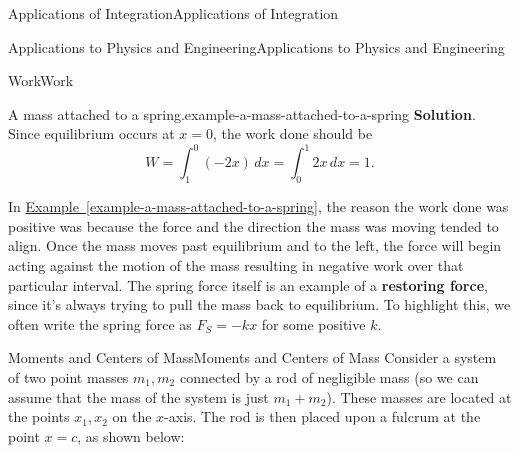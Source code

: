 \documentclass[10pt,]{book}
\newcommand{\terminology}[1]{\textbf{#1}}
\numberwithin{equation}{section}
\begin{document}
\begin{chapterptx}{Applications of Integration}{}{Applications of Integration}{}{}
\begin{sectionptx}{Applications to Physics and Engineering}{}{Applications to Physics and Engineering}{}{}
\begin{subsectionptx}{Work}{}{Work}{}{}
\begin{example}{A mass attached to a spring.}{example-a-mass-attached-to-a-spring}
\noindent\textbf{Solution}.\hypertarget{solution-149}{}\quad%
\hypertarget{p-686}{}%
Since equilibrium occurs at \(x = 0\), the work done should be%
\begin{equation*}
W = \int_{1}^{0}(-2x)\,dx = \int_{0}^{1}2x\,dx = 1.
\end{equation*}
%
\end{example}
\hypertarget{p-687}{}%
In \hyperref[example-a-mass-attached-to-a-spring]{Example~\ref{example-a-mass-attached-to-a-spring}}, the reason the work done was positive was because the force and the direction the mass was moving tended to align. Once the mass moves past equilibrium and to the left, the force will begin acting against the motion of the mass resulting in negative work over that particular interval. The spring force itself is an example of a \terminology{restoring force}, since it's always trying to pull the mass back to equilibrium. To highlight this, we often write the spring force as \(F_{S} = -kx\) for some positive \(k\).%
\end{subsectionptx}
%
%
\typeout{************************************************}
\typeout{************************************************}
%
\begin{subsectionptx}{Moments and Centers of Mass}{}{Moments and Centers of Mass}{}{}\label{subsection-moments-and-centers-of-mass}
\hypertarget{p-688}{}%
Consider a system of two point masses \(m_{1},m_{2}\) connected by a rod of negligible mass (so we can assume that the mass of the system is just \(m_{1}+m_{2}\)). These masses are located at the points \(x_{1},x_{2}\) on the \(x\)-axis. The rod is then placed upon a fulcrum at the point \(x=c\), as shown below:%
\begin{figure}
\centering
{
}
\end{figure}
\end{subsectionptx}
\end{sectionptx}
\end{chapterptx}
\end{document}
